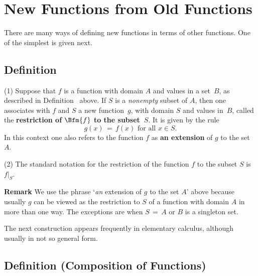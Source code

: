 \V
\V

                        \section{New Functions from Old Functions}
                        \label{SectA35}

        There are many ways of defining new functions in terms of other functions. One of the simplest is given next.

\VV


        \subsection{\small{\bf Definition}}
        \label{DefA30.127}
        

\hspace*{\parindent} (1) Suppose that $f$ is a function with domain $A$ and values in a set~$B$, as described in Definition~ above.
    If $S$ is a {\em nonempty} subset of $A$, then one associates with $f$ and $S$ a new function~$g$, with domain $S$ and values in~$B$,
    called the {\bf restriction of $\Bfm{f}$ to the subset~$S$}. It is given by the rule
        \begin{displaymath}
        g(x) \,=\, f(x) \mbox{ for all $x{\in}S$}.
        \end{displaymath}
    In this context one also refers to the function $f$ as {\bf an extension} of $g$ to the set~$A$.

\V

        (2) The standard notation for the restriction of the function $f$ to the subset $S$ is $f|_{S}$.


\VV

        {\bf Remark} We use the phrase `{\em an} extension of $g$ to the set $A$' above
    because usually $g$ can be viewed as the restriction to $S$ of a function with domain $A$ in more than one way.
    The exceptions are when $S \,=\, A$ or $B$ is a singleton set.

\VV

        The next construction appears frequently in elementary calculus, although usually in not so general form.

\V

          \subsection{\small{{\bf Definition} (Composition of Functions)}}
                  \label{DefA30.130}

